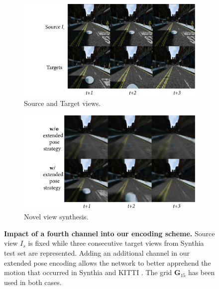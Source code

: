 \begin{figure}[htp!]
    \centering
    \begin{subfigure}[b]{0.48\linewidth}
      \includegraphics[width=\linewidth]{images/epipolarnvs/ablationSynthia_New.png}
      \caption{Source and Target views.}
    \end{subfigure}
    \quad %
    \begin{subfigure}[b]{0.48\linewidth}
      \includegraphics[width=\linewidth]{images/epipolarnvs/ablationSynthia2_New.png}
      \caption{Novel view synthesis.}
    \end{subfigure}
    \caption{\textbf{Impact of a fourth channel into our encoding scheme.} Source view $I_s$ is fixed while three consecutive target views from Synthia \cite{ros2016synthia} test set are represented. Adding an additional channel in our extended pose encoding allows the network to better apprehend the motion that occurred in Synthia \cite{ros2016synthia} and KITTI \cite{geiger2012we}. The grid $\textbf{G}_{15}$ has been used in both cases.}
    \label{fig:ablaSynthia}
  \end{figure}

